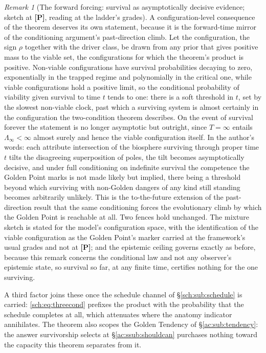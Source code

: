\documentclass[11pt]{article}
\numberwithin{equation}{section}
\theoremstyle{plain}
\theoremstyle{definition}
\theoremstyle{remark}
\newtheorem{remark}[theorem]{Remark}
\begin{document}
\begin{remark}[The forward forcing: survival as asymptotically
decisive evidence; sketch at \textbf{[P]}, reading at the ladder's
grades]\label{gr1:rem:forwardforcing}
A configuration-level consequence of the theorem deserves its own
statement, because it is the forward-time mirror of the conditioning
argument's past-direction climb. Let the configuration, the sign
$\rho$ together with the driver class, be drawn from any prior that
gives positive mass to the viable set, the configurations for which
the theorem's product is positive. Non-viable configurations have
survival probabilities decaying to zero, exponentially in the trapped
regime and polynomially in the critical one, while viable
configurations hold a positive limit, so the conditional probability
of viability given survival to time $t$ tends to one: there is a soft
threshold in $t$, set by the slowest non-viable clock, past which a
surviving system is almost certainly in the configuration the
two-condition theorem describes. On the event of survival forever the
statement is no longer asymptotic but outright, since $T=\infty$
entails $\Lambda_\infty<\infty$ almost surely and hence the viable
configuration itself. In the author's words: each attribute
intersection of the biosphere surviving through proper time $t$ tilts
the disagreeing superposition of poles, the tilt becomes
asymptotically decisive, and under full conditioning on indefinite
survival the competence the Golden Point marks is not made likely but
implied, there being a threshold beyond which surviving with
non-Golden dangers of any kind still standing becomes arbitrarily
unlikely. This is the to-the-future extension of the past-direction
result that the same conditioning forces the evolutionary climb by
which the Golden Point is reachable at all. Two fences hold
unchanged. The mixture sketch is stated for the model's configuration
space, with the identification of the viable configuration as the
Golden Point's marker carried at the framework's usual grades and not
at \textbf{[P]}; and the epistemic ceiling governs exactly as before,
because this remark concerns the conditional law and not any
observer's epistemic state, so survival so far, at any finite time,
certifies nothing for the one surviving.
\end{remark}

\noindent A third factor joins these once the schedule channel of
\S\ref{sch:sub:schedule} is carried: \eqref{sch:eq:threecond} prefixes
the product with the probability that the schedule completes at all, which
attenuates where the anatomy indicator annihilates. \noindent The theorem also scopes the Golden Tendency of
\S\ref{ac:sub:tendency}: the answer survivorship selects at
\S\ref{ac:ssub:shouldcan} purchases nothing toward the capacity this
theorem separates from it.
\end{document}
